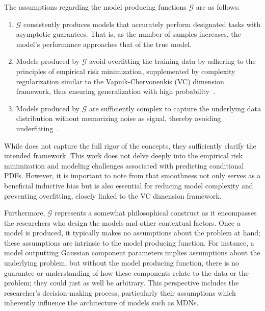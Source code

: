 \begin{definition}\label{def:model_producing}
    The assumptions regarding the model producing functions $\mathcal{G}$ are as follows:
    \begin{enumerate}
        \item $\mathcal{G}$ consistently produces models that accurately perform designated tasks with asymptotic guarantees. That is, as the number of samples increases, the model's performance approaches that of the true model.
        \item Models produced by $\mathcal{G}$ avoid overfitting the training data by adhering to the principles of empirical risk minimization, supplemented by complexity regularization similar to the Vapnik-Chervonenkis (VC) dimension framework, thus ensuring generalization with high probability~\cite{vapnik1999overview}.
        \item Models produced by $\mathcal{G}$ are sufficiently complex to capture the underlying data distribution without memorizing noise as signal, thereby avoiding underfitting~\cite{vapnik1999overview}.
    \end{enumerate}
\end{definition}

While  does not capture the full rigor of the concepts, they sufficiently clarify the intended framework. This work does not delve deeply into the empirical risk minimization and modeling challenges associated with predicting conditional PDFs. However, it is important to note from  that smoothness not only serves as a beneficial inductive bias but is also essential for reducing model complexity and preventing overfitting, closely linked to the VC dimension framework.

Furthermore, $\mathcal{G}$ represents a somewhat philosophical construct as it encompasses the researchers who design the models and other contextual factors. Once a model is produced, it typically makes no assumptions about the problem at hand; these assumptions are intrinsic to the model producing function. For instance, a model outputting Gaussian component parameters implies assumptions about the underlying problem, but without the model producing function, there is no guarantee or understanding of how these components relate to the data or the problem; they could just as well be arbitrary. This perspective includes the researcher's decision-making process, particularly their assumptions which inherently influence the architecture of models such as MDNs.

